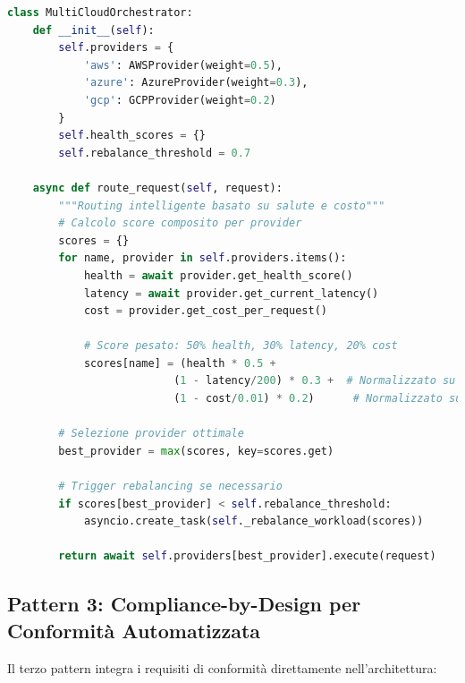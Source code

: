 \begin{lstlisting}[language=Python, caption={Orchestrazione Multi-Cloud Intelligente}]
class MultiCloudOrchestrator:
    def __init__(self):
        self.providers = {
            'aws': AWSProvider(weight=0.5),
            'azure': AzureProvider(weight=0.3),
            'gcp': GCPProvider(weight=0.2)
        }
        self.health_scores = {}
        self.rebalance_threshold = 0.7
    
    async def route_request(self, request):
        """Routing intelligente basato su salute e costo"""
        # Calcolo score composito per provider
        scores = {}
        for name, provider in self.providers.items():
            health = await provider.get_health_score()
            latency = await provider.get_current_latency()
            cost = provider.get_cost_per_request()
            
            # Score pesato: 50% health, 30% latency, 20% cost
            scores[name] = (health * 0.5 + 
                          (1 - latency/200) * 0.3 +  # Normalizzato su 200ms
                          (1 - cost/0.01) * 0.2)      # Normalizzato su 0.01€
        
        # Selezione provider ottimale
        best_provider = max(scores, key=scores.get)
        
        # Trigger rebalancing se necessario
        if scores[best_provider] < self.rebalance_threshold:
            asyncio.create_task(self._rebalance_workload(scores))
        
        return await self.providers[best_provider].execute(request)
\end{lstlisting}

\subsection{\texorpdfstring{Pattern 3: Compliance-by-Design per Conformità Automatizzata}{3.3.3 - Pattern 3: Compliance-by-Design per Conformità Automatizzata}}

Il terzo pattern integra i requisiti di conformità direttamente nell'architettura:

